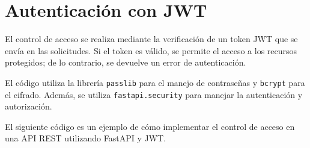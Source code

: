 \chapter{Autenticación con JWT}

\label{AppendixB}
El control de acceso se realiza mediante la verificación de un token JWT que se
envía en las solicitudes. Si el token es válido, se permite el acceso a los
recursos protegidos; de lo contrario, se devuelve un error de autenticación.

El código utiliza la librería \texttt{passlib} para el manejo de contraseñas
y \texttt{bcrypt} para el cifrado. Además, se utiliza \texttt{fastapi.security}
para manejar la autenticación y autorización.

El siguiente código es un ejemplo de cómo implementar el control de acceso en
una API REST utilizando FastAPI y JWT.



